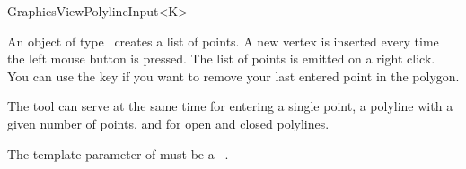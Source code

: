
\begin{ccRefClass}{GraphicsViewPolylineInput<K>}

\ccDefinition
An object of type \ccRefName\ creates a list of points. A new 
vertex is inserted every time the left mouse button is pressed.
The list of points is emitted on a right click. You can use the 
key if you want to remove your last entered point in the polygon.

The tool can serve at the same time for entering a single point,
a polyline with a given number of points, and for open and closed
polylines.


\ccParameters

The template parameter of  must be a \cgal\ . 

\ccInheritsFrom
{}

\ccGlue

\ccCreation
{}


\end{ccRefClass}







